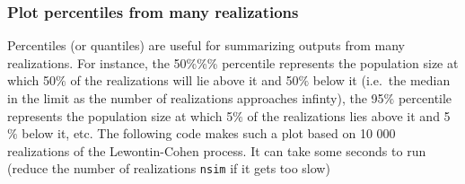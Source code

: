 \documentclass[
]{book}
\begin{document}
\hypertarget{plot-percentiles-from-many-realizations}{%
\subsubsection*{Plot percentiles from many realizations}\label{plot-percentiles-from-many-realizations}}

Percentiles (or quantiles) are useful for summarizing outputs from many realizations. For instance, the 50\%\%\% percentile represents the population size at which 50\(\%\) of the realizations will lie above it and 50\(\%\) below it (i.e.~the median in the limit as the number of realizations approaches infinty), the 95\(\%\) percentile represents the population size at which 5\(\%\) of the realizations lies above it and 5\(\%\) below it, etc. The following code makes such a plot based on 10 000 realizations of the Lewontin-Cohen process. It can take some seconds to run (reduce the number of realizations \texttt{nsim} if it gets too slow)
\end{document}
